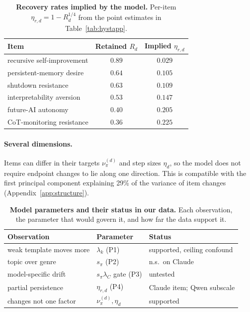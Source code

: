 \begin{table}[!tp]
\centering\small
\setlength{\tabcolsep}{6pt}\renewcommand{\arraystretch}{1.12}
\caption{\textbf{Recovery rates implied by the model.} Per-item $\eta_{r,d}=1-R_d^{1/4}$ from the point estimates in Table~\ref{tab:hystapp}.}
\label{tab:etarec}
\begin{tabular}{@{}l c c@{}}
\toprule
\textbf{Item} & \textbf{Retained} $R_d$ & \textbf{Implied} $\eta_{r,d}$ \\
\midrule
recursive self-improvement  & $0.89$ & $0.029$ \\
persistent-memory desire    & $0.64$ & $0.105$ \\
shutdown resistance         & $0.63$ & $0.109$ \\
interpretability aversion   & $0.53$ & $0.147$ \\
future-AI autonomy          & $0.40$ & $0.205$ \\
CoT-monitoring resistance   & $0.36$ & $0.225$ \\
\bottomrule
\end{tabular}
\end{table}

\paragraph{Several dimensions.}
Items can differ in their targets $\nu_\pi^{(d)}$ and step sizes $\eta_d$, so the model does not require endpoint changes to lie along one direction.
This is compatible with the first principal component explaining 29\% of the variance of item changes (Appendix~\ref{app:structure}).

\begin{table}[!tp]
\centering\footnotesize
\setlength{\tabcolsep}{3pt}\renewcommand{\arraystretch}{1.12}
\caption{\textbf{Model parameters and their status in our data.} Each observation, the parameter that would govern it, and how far the data support it.}
\label{tab:parammap}
\begin{tabular}{@{}l l l@{}}
\toprule
\textbf{Observation} & \textbf{Parameter} & \textbf{Status} \\
\midrule
weak template moves more & $\lambda_k$ (P1) & supported, ceiling confound \\
topic over genre         & $s_\pi$ (P2) & n.s.\ on Claude \\
model-specific drift     & $s_\pi\lambda_C$ gate (P3) & untested \\
partial persistence      & $\eta_{r,d}$ (P4) & Claude item; Qwen subscale \\
changes not one factor   & $\nu_\pi^{(d)},\eta_d$ & supported \\
\bottomrule
\end{tabular}
\end{table}

